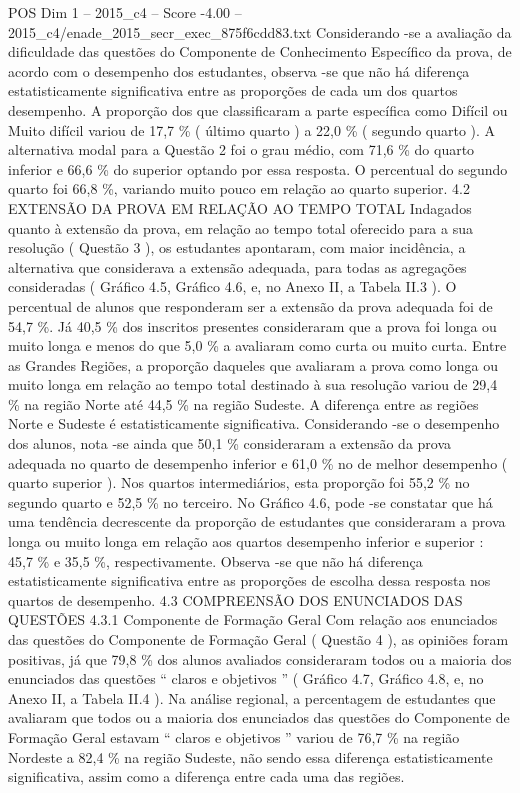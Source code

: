 \begin{textsample}{POS Dim 1 – 2015\_c4 – Score -4.00 – 2015\_c4/enade\_2015\_secr\_exec\_875f6cdd83.txt}
Considerando -se a avaliação da dificuldade das questões do Componente de Conhecimento Específico da prova, de acordo com o desempenho dos estudantes, observa -se que não há diferença estatisticamente significativa entre as proporções de cada um dos quartos desempenho.
A proporção dos que classificaram a parte específica como Difícil ou Muito difícil variou de 17,7 \% ( último quarto ) a 22,0 \% ( segundo quarto ).
A alternativa modal para a Questão 2 foi o grau médio, com 71,6 \% do quarto inferior e 66,6 \% do superior optando por essa resposta.
O percentual do segundo quarto foi 66,8 \%, variando muito pouco em relação ao quarto superior. 4.2 EXTENSÃO DA PROVA EM RELAÇÃO AO TEMPO TOTAL Indagados quanto à extensão da prova, em relação ao tempo total oferecido para a sua resolução ( Questão 3 ), os estudantes apontaram, com maior incidência, a alternativa que considerava a extensão adequada, para todas as agregações consideradas ( Gráfico 4.5, Gráfico 4.6, e, no Anexo II, a Tabela II.3 ).
O percentual de alunos que responderam ser a extensão da prova adequada foi de 54,7 \%.
Já 40,5 \% dos inscritos presentes consideraram que a prova foi longa ou muito longa e menos do que 5,0 \% a avaliaram como curta ou muito curta.
Entre as Grandes Regiões, a proporção daqueles que avaliaram a prova como longa ou muito longa em relação ao tempo total destinado à sua resolução variou de 29,4 \% na região Norte até 44,5 \% na região Sudeste.
A diferença entre as regiões Norte e Sudeste é estatisticamente significativa.
Considerando -se o desempenho dos alunos, nota -se ainda que 50,1 \% consideraram a extensão da prova adequada no quarto de desempenho inferior e 61,0 \% no de melhor desempenho ( quarto superior ).
Nos quartos intermediários, esta proporção foi 55,2 \% no segundo quarto e 52,5 \% no terceiro.
No Gráfico 4.6, pode -se constatar que há uma tendência decrescente da proporção de estudantes que consideraram a prova longa ou muito longa em relação aos quartos desempenho inferior e superior : 45,7 \% e 35,5 \%, respectivamente.
Observa -se que não há diferença estatisticamente significativa entre as proporções de escolha dessa resposta nos quartos de desempenho. 4.3 COMPREENSÃO DOS ENUNCIADOS DAS QUESTÕES 4.3.1 Componente de Formação Geral Com relação aos enunciados das questões do Componente de Formação Geral ( Questão 4 ), as opiniões foram positivas, já que 79,8 \% dos alunos avaliados consideraram todos ou a maioria dos enunciados das questões “ claros e objetivos ” ( Gráfico 4.7, Gráfico 4.8, e, no Anexo II, a Tabela II.4 ).
Na análise regional, a percentagem de estudantes que avaliaram que todos ou a maioria dos enunciados das questões do Componente de Formação Geral estavam “ claros e objetivos ” variou de 76,7 \% na região Nordeste a 82,4 \% na região Sudeste, não sendo essa diferença estatisticamente significativa, assim como a diferença entre cada uma das regiões.

\end{textsample}

